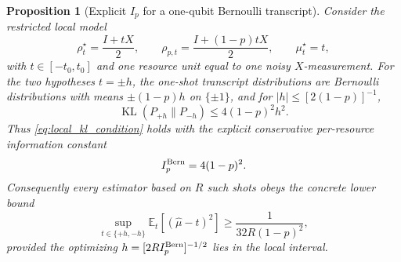 \documentclass[11pt]{article}
\newtheorem{proposition}{Proposition}
\DeclareMathOperator{\KL}{KL}
\newcommand{\E}{\mathbb{E}}
\newcommand{\1}{\mathbf{1}}
\newcommand{\abs}[1]{\left\lvert #1 \right\rvert}
\begin{document}
\begin{proposition}[Explicit \(I_p\) for a one-qubit Bernoulli transcript]
\label{prop:explicit_ip_bernoulli_v5}
Consider the restricted local model
\begin{equation}
    \rho_t^\star=\frac{I+tX}{2},
    \qquad
    \rho_{p,t}=\frac{I+(1-p)tX}{2},
    \qquad
    \mu_t^\star=t,
\end{equation}
with \(t\in[-t_0,t_0]\) and one resource unit equal to one noisy \(X\)-measurement.  For the two hypotheses \(t=\pm h\), the one-shot transcript distributions are Bernoulli distributions with means \(\pm(1-p)h\) on \(\{\pm1\}\), and for \(\abs{h}\le[2(1-p)]^{-1}\),
\begin{equation}
    \KL(P_{+h}\|P_{-h})
    \le 4(1-p)^2h^2.
\end{equation}
Thus \cref{eq:local_kl_condition} holds with the explicit conservative per-resource information constant
\begin{equation}
    I_p^{\rm Bern}=4(1-p)^2.
    \label{eq:explicit_ip_bernoulli_v5}
\end{equation}
Consequently every estimator based on \(R\) such shots obeys the concrete lower bound
\begin{equation}
    \sup_{t\in\{+h,-h\}}
    \E_t[(\widehat\mu-t)^2]
    \ge \frac{1}{32R(1-p)^2},
\end{equation}
provided the optimizing \(h=[2RI_p^{\rm Bern}]^{-1/2}\) lies in the local interval.
\end{proposition}
\end{document}
